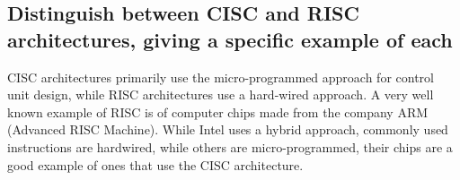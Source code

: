 \documentclass{article}
\begin{document}
\subsection{Distinguish between CISC and RISC architectures, giving a specific example of each}

CISC architectures primarily use the micro-programmed approach for control unit design, while RISC architectures use a hard-wired approach. A very well known example of RISC is of computer chips made from the company ARM (Advanced RISC Machine). While Intel uses a hybrid approach, commonly used instructions are hardwired, while others are micro-programmed, their chips are a good example of ones that use the CISC architecture.
\end{document}
